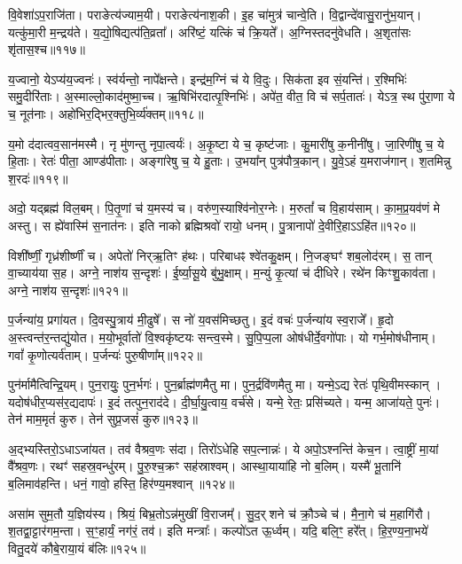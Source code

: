 वि॒वेशा॑ऽप॒राजि॑ता। पराङेत्य॑ज्याम॒यी। 
पराङेत्य॑नाश॒की। इ॒ह चा॑मुत्र॑ चान्वे॒ति। 
वि॒द्वान्दे॑वासु॒रानु॑भ॒यान्। यत्कु॑मा॒री म॒न्द्रय॑ते। 
य॒द्यो॒षिद्यत्प॑ति॒व्रता᳚। अरि॑ष्टं॒ यत्किं च॑ क्रि॒यते᳚। 
अ॒ग्निस्तदनु॑वेधति। अ॒शृता॑सः शृ॑तास॒श्च॥११७॥


य॒ज्वानो॒ येऽप्य॑य॒ज्वनः॑। स्व॑र्यन्तो॒ नापे᳚क्षन्ते। 
इन्द्र॑म॒ग्निं च॑ ये वि॒दुः। सिक॑ता इव सं॒यन्ति॑। 
र॒श्मिभिः॑ समु॒दीरि॑ताः। अ॒स्मा\-ल्लो॒का\-द॑मुष्मा॒च्च। 
ऋ॒षिभि॑रदात्पृ॒श्निभिः॑। 
अपे॑त॒ वीत॒ वि च॑ सर्प॒तातः॑। येऽत्र॒ स्थ पु॑रा॒णा ये च॒ नूत॑नाः। 
अहो॑भिर॒द्भिर॒क्तु\-भि॒र्व्य॑क्तम्॥११८॥


य॒मो द॑दात्वव॒सान॑मस्मै। नृ मु॑णन्तु नृपा॒त्वर्यः॑। 
अ॒कृ॒ष्टा ये च॒ कृष्ट॑जाः। कु॒मारी॑षु क॒नीनी॑षु। 
जा॒रिणी॑षु च॒ ये हि॒ताः। रेतः॑ पीता॒ आण्ड॑पीताः। 
अङ्गा॑रेषु च॒ ये हु॒ताः। उ॒भया᳚न्‌ पुत्र॑पौत्र॒कान्। 
यु॒वे॒ऽहं य॒मराज॑गान्। श॒तमिन्नु श॒रदः॑॥११९॥


अदो॒ यद्ब्रह्म॑ विल॒बम्। पि॒तृ॒णां च॑ य॒मस्य॑ च। 
वरु॑ण॒स्याश्वि॑नोर॒ग्नेः। म॒रुतां᳚ च वि॒हाय॑साम्। 
का॒म॒प्र॒यव॑णं मे अस्तु। स ह्ये॑वास्मि॑ स॒नात॑नः। 
इति नाको ब्रह्मिश्रवो॑ रायो॒ धनम्। पु॒त्रानापो॑ दे॒वीरि॒हाऽऽहि॑त॥१२०॥\anuvakamend


विशी᳚र्ष्णीं॒ गृध्र॑शीर्ष्णीं च। अपेतो॑ निर्‌ऋ॒तिꣳ ह॑थः। 
परिबाधꣴ श्वे॑तकु॒क्षम्। नि॒जङ्घꣳ॑ शब॒लोद॑रम्। 
स॒ तान्‌ वा॒च्याय॑या स॒ह। अग्ने॒ नाश॑य स॒न्दृशः॑। 
ई॒र्ष्या॒सू॒ये बु॑भु॒क्षाम्। म॒न्युं कृ॒त्यां च॑ दीधिरे। 
रथे॑न किꣳशु॒काव॑ता। अग्ने॒ नाश॑य स॒न्दृशः॑॥१२१॥\anuvakamend


प॒र्जन्या॑य॒ प्रगा॑यत। दि॒वस्पु॒त्राय॑ मी॒ढुषे᳚। 
स नो॑ य॒वस॑मिच्छतु। इ॒दं वचः॑ प॒र्जन्या॑य स्व॒राजे᳚। 
हृ॒दो अ॒स्त्वन्त॑र॒न्तद्यु॑योत। म॒यो॒भूर्वातो॑ वि॒श्वकृ॑ष्टयः सन्त्व॒स्मे। 
सु॒पि॒प्प॒ला ओष॑धीर्दे॒वगो॑पाः। यो गर्भ॒मोष॑धीनाम्। 
गवां᳚ कृ॒णोत्यर्व॑ताम्। प॒र्जन्यः॑ पुरु॒षीणा᳚म्॥१२२॥\anuvakamend


पुन॑र्मामैत्विन्द्रि॒यम्। पुन॒रायुः॒ पुन॒र्भगः॑। 
पुन॒र्ब्राह्म॑णमैतु मा। पुन॒र्द्रवि॑णमैतु मा। 
यन्मे॒ऽद्य रेतः॑ पृथि॒वीमस्कान्। यदोष॑धीर॒प्यस॑र॒द्यदापः॑। 
इ॒दं तत्पुन॒राद॑दे। दी॒र्घा॒यु॒त्वाय॒ वर्च॑से। 
यन्मे॒ रेतः॒ प्रसि॑च्यते। यन्म॒ आजा॑यते॒ पुनः॑। 
तेन॑ माम॒मृतं॑ कुरु। तेन॑ सुप्र॒जसं॑ कुरु॥१२३॥\anuvakamend


अ॒द्भ्यस्तिरो॒ऽधाऽजा॑यत। तव॑ वैश्रव॒णः स॑दा। 
तिरो॑ऽधेहि सप॒त्नान्नः॑। ये अपो॒ऽश्नन्ति॑ केच॒न। 
त्वा॒ष्ट्रीं मा॒यां वै᳚श्रव॒णः। रथꣳ॑ सहस्र॒वन्धु॑रम्। 
पु॒रु॒श्च॒क्रꣳ सह॑स्राश्वम्। आस्था॒याया॑हि नो ब॒लिम्। 
यस्मै॑ भू॒तानि॑ ब॒लिमाव॑हन्ति। धनं॒ गावो॒ हस्ति॒ हिर॑ण्य॒मश्वान्॥१२४॥


असा॑म सुम॒तौ य॒ज्ञिय॑स्य। श्रियं॒ बिभ्र॒तोऽन्न॑मुखीं वि॒राजम्‌᳚। 
सु॒द॒र्‌शने च॑ क्रौ॒ञ्चे च॑। मै॒ना॒गे च॑ म॒हागि॑रौ। 
श॒तद्वा॒ट्टार॑गम॒न्ता। स॒ꣳ॒हार्यं॒ नग॑रं॒ तव॑। 
इति मन्त्राः᳚। कल्पो॑ऽत ऊ॒र्ध्वम्। यदि॒ बलि॒ꣳ॒ हरे᳚त्। 
हि॒र॒ण्य॒ना॒भये॑ वितु॒दये॑ कौबे॒राया॒यं ब॑लिः॥१२५॥


